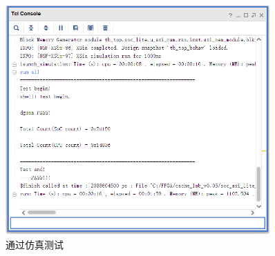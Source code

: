 \begin{figure}[H]
    \centering
    \includegraphics[width=0.9\textwidth]{image/pass.png}
    \caption{通过仿真测试}
    \label{fig:tcl}
\end{figure}